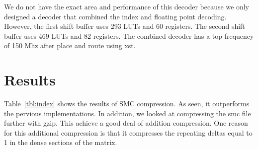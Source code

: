 We do not have the exact area and performance of this decoder because we only designed a decoder that combined the index and floating point decoding. However, the first shift buffer uses 293 LUTs and 60 registers. The second shift buffer uses 469 LUTs and 82 registers. The combined decoder has a top frequency of 150 Mhz after place and route using xst.

\section{Results}
\label{sec:smc_discussion}

Table~\ref{tbl:index}  shows the results of SMC compression. As seen, it outperforms the pervious implementations. In addition, we looked at compressing the smc file further with gzip. This achieve a good deal of addition compression. One reason for this additional compression is that it compresses the repeating deltas equal to 1 in the dense sections of the matrix.
